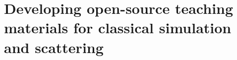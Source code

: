
\chapter{Developing open-source teaching materials for classical simulation and scattering} %

\label{teaching} %





\pagebreak





\renewcommand\bibsection{\section{\refname}}



